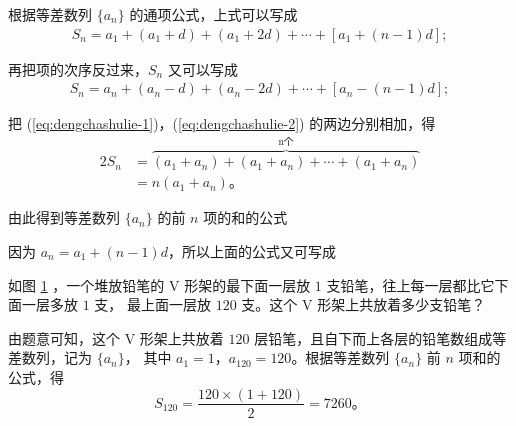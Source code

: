 根据等差数列 $\{a_n\}$ 的通项公式，上式可以写成
\begin{gather}
    S_n = a_1 + (a_1 + d)  + (a_1 + 2d) + \cdots + [a_1 + (n - 1)d]; \tag{$1$}\label{eq:dengchashulie-1}
\end{gather}

再把项的次序反过来，$S_n$ 又可以写成
\begin{gather}
    S_n = a_n + (a_n - d)  + (a_n - 2d) + \cdots + [a_n - (n - 1)d]; \tag{$2$}\label{eq:dengchashulie-2}
\end{gather}

把 (\ref{eq:dengchashulie-1})，(\ref{eq:dengchashulie-2}) 的两边分别相加，得
\begin{align*}
    2S_n &= \overbrace{(a_1 + a_n) + (a_1 + a_n) + \cdots + (a_1 + a_n)}^\text{n个} \\
       &= n(a_1 + a_n) \text{。}
\end{align*}

由此得到等差数列 $\{a_n\}$ 的前 $n$ 项的和的公式
\begin{center}
\end{center}

因为 $a_n = a_1 + (n - 1) d$，所以上面的公式又可写成
\begin{center}
\end{center}


\liti 如图 \ref{fig:2-5} ，一个堆放铅笔的 V 形架的最下面一层放 $1$ 支铅笔，往上每一层都比它下面一层多放 $1$ 支，
最上面一层放 $120$ 支。这个 V 形架上共放着多少支铅笔？

\begin{figure}[htbp]
    \centering
    
    \caption{}\label{fig:2-5}
\end{figure}

\jie 由题意可知，这个 V 形架上共放着 $120$ 层铅笔，且自下而上各层的铅笔数组成等差数列，记为 $\{a_n\}$，
其中 $a_1 = 1$，$a_{120} = 120$。根据等差数列 $\{a_n\}$ 前 $n$ 项和的公式，得
$$ S_{120} = \dfrac{120 \times (1 + 120)}{2} = 7260 \text{。}$$

